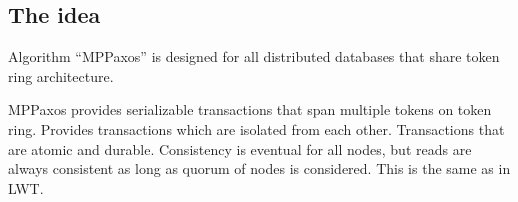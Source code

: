 \subsection{The idea}
Algorithm “MPPaxos” is designed for all distributed databases that share token ring architecture. 

MPPaxos provides serializable transactions that span multiple tokens on token ring. Provides transactions which are isolated from each other. Transactions that are atomic and durable. 
Consistency is eventual for all nodes, but reads are always consistent as long as quorum of nodes is considered. This is the same as in LWT.

